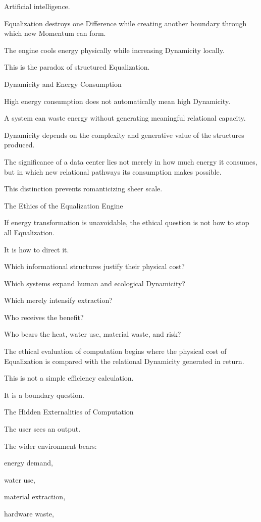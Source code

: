 Artificial intelligence.

Equalization destroys one Difference while creating another boundary through which new Momentum can form.

The engine cools energy physically while increasing Dynamicity locally.

This is the paradox of structured Equalization.

Dynamicity and Energy Consumption

High energy consumption does not automatically mean high Dynamicity.

A system can waste energy without generating meaningful relational capacity.

Dynamicity depends on the complexity and generative value of the structures produced.

The significance of a data center lies not merely in how much energy it consumes, but in which new relational pathways its consumption makes possible.

This distinction prevents romanticizing sheer scale.

The Ethics of the Equalization Engine

If energy transformation is unavoidable, the ethical question is not how to stop all Equalization.

It is how to direct it.

Which informational structures justify their physical cost?

Which systems expand human and ecological Dynamicity?

Which merely intensify extraction?

Who receives the benefit?

Who bears the heat, water use, material waste, and risk?

The ethical evaluation of computation begins where the physical cost of Equalization is compared with the relational Dynamicity generated in return.

This is not a simple efficiency calculation.

It is a boundary question.

The Hidden Externalities of Computation

The user sees an output.

The wider environment bears:

energy demand,

water use,

material extraction,

hardware waste,

